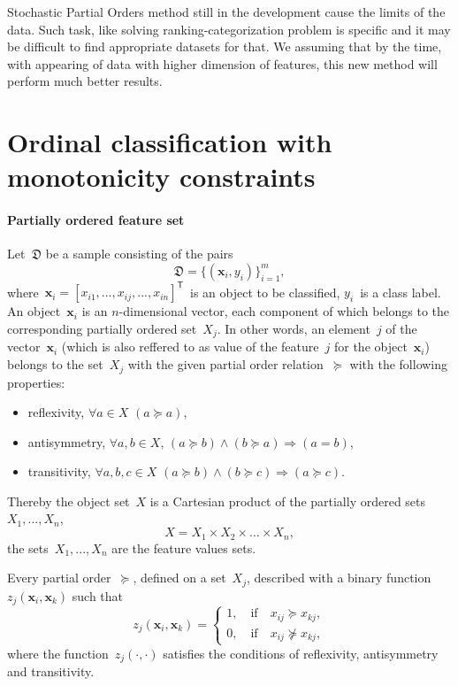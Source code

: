 \documentclass[12pt,preprint]{elsarticle}
\newcommand{\bx}{\mathbf{x}}
\newcommand{\T}{^{\mathsf{T}}}
\begin{document}
Stochastic Partial Orders method still in the development cause the limits of the data. Such task, like solving ranking-categorization problem is specific and it may be difficult to find appropriate datasets for that. We assuming that by the time, with appearing of data with higher dimension of features, this new method will perform much better results.

\section{Ordinal classification with monotonicity constraints}
\paragraph{Partially ordered feature set}
Let~$\mathfrak{D}$ be a sample consisting of the pairs
\[
\mathfrak{D}=\{(\bx_i,y_i)\}_{i=1}^m,
\label{eq:Sample}
\]
where~$\bx_i=[x_{i1},...,x_{ij},...,x_{in}]\T$~is an object to be classified, $y_i$~is a class label. An object~$\bx_i$ is an $n$-dimensional vector, each component of which belongs to the corresponding partially ordered set~$X_j$. In other words, an element~$j$ of the vector~$\bx_i$ (which is also reffered to as value of the feature~$j$ for the object~$\bx_i$) belongs to the set~$X_j$ with the given partial order relation~$\succeq$ with the following properties:
\begin{itemize}
\item reflexivity, $\forall a\in X$ $(a\succeq a)$,
\item antisymmetry, $\forall a,b\in X$, $(a\succeq b)\wedge(b\succeq a)\Rightarrow (a= b)$,
\item transitivity, $\forall a,b,c\in X$ $(a\succeq b)\wedge(b\succeq c)\Rightarrow (a\succeq c)$.
\end{itemize}
Thereby the object set~$X$ is a Cartesian product of the partially ordered sets~$X_1,...,X_n$,
\[
X=X_1\times X_2\times \dots \times X_n,
\]
the sets~$X_1,...,X_n$ are the feature values sets.

Every partial order~$\succeq$, defined on a set~$X_j$, described with a binary function~$z_j(\bx_i,\bx_k)$ such that
\[
z_j(\bx_i,\bx_k)=
\begin{cases}
1,\quad\text{if}\quad x_{ij} \succeq x_{kj}, \\
0,\quad\text{if}\quad x_{ij}\nsucceq x_{kj},
\end{cases}
\]
where the function~$z_j(\cdot,\cdot)$ satisfies the conditions of reflexivity, antisymmetry and transitivity.
\end{document}

